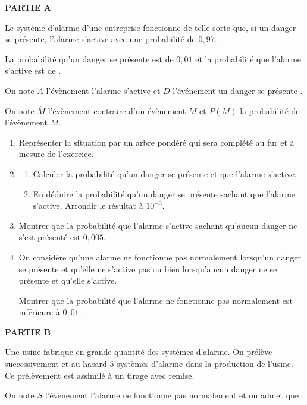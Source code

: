 \medskip

\textbf{PARTIE A}

\medskip

Le système d'alarme d'une entreprise fonctionne de telle sorte que, si un danger se présente, l'alarme s'active avec une probabilité de $0,97$. 

La probabilité qu'un danger se présente est de $0,01$ et la probabilité que l'alarme s'active est de .

On note $A$ l'évènement \og  l'alarme s'active \fg{}  et $D$ l'événement \og  un danger se présente \fg . 

On note $\overline{M}$ l'évènement contraire d'un évènement $M$ et $P(M)$ la probabilité de l'évènement $M$.

\medskip

\begin{enumerate}
\item Représenter la situation par un arbre pondéré qui sera complété au fur et à mesure de l'exercice.
\item  
	\begin{enumerate}
		\item Calculer la probabilité qu'un danger se présente et que l'alarme s'active.
		\item En déduire la probabilité qu'un danger se présente sachant que l'alarme s'active.
Arrondir le résultat à $10^{-3}$.
	\end{enumerate}
\item  Montrer que la probabilité que l'alarme s'active sachant qu'aucun danger ne s'est présenté est $0,005$.
\item On considère qu'une alarme ne fonctionne pas normalement lorsqu'un danger se présente et qu'elle ne s'active pas ou bien lorsqu'aucun danger ne se présente et qu'elle s'active.

Montrer que la probabilité que l'alarme ne fonctionne pas normalement est inférieure à $0,01$.
\end{enumerate}

\medskip

\textbf{PARTIE B}

\medskip

Une usine fabrique en grande quantité des systèmes d'alarme. On prélève successivement et au hasard $5$ systèmes d'alarme dans la production de l'usine. Ce prélèvement est assimilé à un tirage avec remise.

On note $S$ l'évènement \og  l'alarme ne fonctionne pas normalement \fg{}  et on admet que

